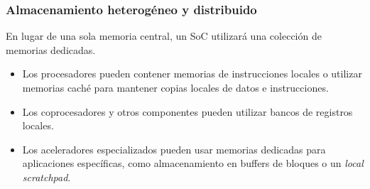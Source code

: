 \documentclass[aspectratio=169]{beamer}
\begin{document}
\begin{frame}[t,fragile]
    \frametitle{Almacenamiento heterogéneo y distribuido}
    En lugar de una sola memoria central, un SoC utilizará una colección de memorias dedicadas.\\
    \bigskip
    \begin{itemize}
    \setlength\itemsep{0.3cm}
    \item<2-> Los \textcolor{verdeuca}{procesadores} pueden contener memorias de instrucciones \textcolor{verdeuca}{locales} o utilizar \textcolor{verdeuca}{memorias caché} para mantener copias locales de datos e instrucciones.\\
    \item<3-> Los \textcolor{verdeuca}{coprocesadores} y otros componentes pueden utilizar \textcolor{verdeuca}{bancos de registros locales}.\\
    \item<4-> Los \textcolor{verdeuca}{aceleradores especializados} pueden usar memorias dedicadas para aplicaciones específicas, como almacenamiento en \textcolor{verdeuca}{buffers de bloques} o \textcolor{verdeuca}{un \emph{local scratchpad}}.\\
    \end{itemize}
    \bigskip
\end{frame}
\end{document}

